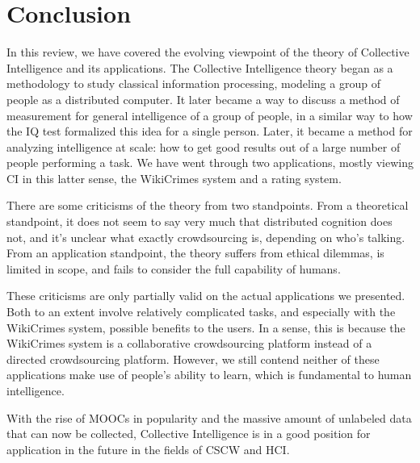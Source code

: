 \section{Conclusion}
In this review, we have covered the evolving viewpoint of the theory of Collective Intelligence and its applications. The Collective Intelligence theory began as a methodology to study classical information processing, modeling a group of people as a distributed computer. It later became a way to discuss a method of measurement for general intelligence of a group of people, in a similar way to how the IQ test formalized this idea for a single person. Later, it became a method for analyzing intelligence at scale: how to get good results out of a large number of people performing a task. We have went through two applications, mostly viewing CI in this latter sense, the WikiCrimes system and a rating system. 

There are some criticisms of the theory from two standpoints. From a theoretical standpoint, it does not seem to say very much that distributed cognition does not, and it's unclear what exactly crowdsourcing is, depending on who's talking. From an application standpoint, the theory suffers from ethical dilemmas, is limited in scope, and fails to consider the full capability of humans.

These criticisms are only partially valid on the actual applications we presented. Both to an extent involve relatively complicated tasks, and especially with the WikiCrimes system, possible benefits to the users. In a sense, this is because the WikiCrimes system is a collaborative crowdsourcing platform instead of a directed crowdsourcing platform. However, we still contend neither of these applications make use of people's ability to learn, which is fundamental to human intelligence. 

With the rise of MOOCs in popularity and the massive amount of unlabeled data that can now be collected, Collective Intelligence is in a good position for application in the future in the fields of CSCW and HCI.